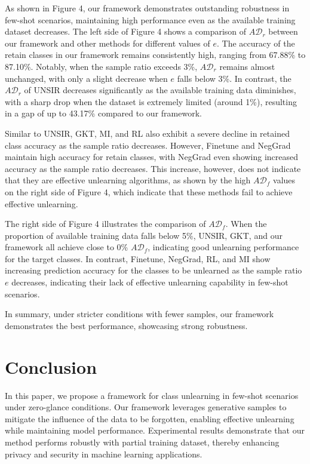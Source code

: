 \documentclass[preprint,12pt]{elsarticle}
\begin{document}
As shown in Figure 4, our framework demonstrates outstanding robustness in few-shot scenarios, maintaining high performance even as the available training dataset decreases. The left side of Figure 4 shows a comparison of $A\mathcal{D}_r$ between our framework and other methods for different values of \(e\). The accuracy of the retain classes in our framework remains consistently high, ranging from 67.88\% to 87.10\%. Notably, when the sample ratio exceeds 3\%, $A\mathcal{D}_r$ remains almost unchanged, with only a slight decrease when \(e\) falls below 3\%. In contrast, the $A\mathcal{D}_r$ of UNSIR decreases significantly as the available training data diminishes, with a sharp drop when the dataset is extremely limited (around 1\%), resulting in a gap of up to 43.17\% compared to our framework.

Similar to UNSIR, GKT, MI, and RL also exhibit a severe decline in retained class accuracy as the sample ratio decreases. However, Finetune and NegGrad maintain high accuracy for retain classes, with NegGrad even showing increased accuracy as the sample ratio decreases. This increase, however, does not indicate that they are effective unlearning algorithms, as shown by the high $A\mathcal{D}_f$ values on the right side of Figure 4, which indicate that these methods fail to achieve effective unlearning.

The right side of Figure 4 illustrates the comparison of $A\mathcal{D}_f$. When the proportion of available training data falls below 5\%, UNSIR, GKT, and our framework all achieve close to 0\% $A\mathcal{D}_f$, indicating good unlearning performance for the target classes. In contrast, Finetune, NegGrad, RL, and MI show increasing prediction accuracy for the classes to be unlearned as the sample ratio \(e\) decreases, indicating their lack of effective unlearning capability in few-shot scenarios.

In summary, under stricter conditions with fewer samples, our framework demonstrates the best performance, showcasing strong robustness.


\section{Conclusion}
In this paper, we propose a framework for class unlearning in few-shot scenarios under zero-glance conditions. Our framework leverages generative samples to mitigate the influence of the data to be forgotten, enabling effective unlearning while maintaining model performance. Experimental results demonstrate that our method performs robustly with partial training dataset, thereby enhancing privacy and security in machine learning applications.
\end{document}
